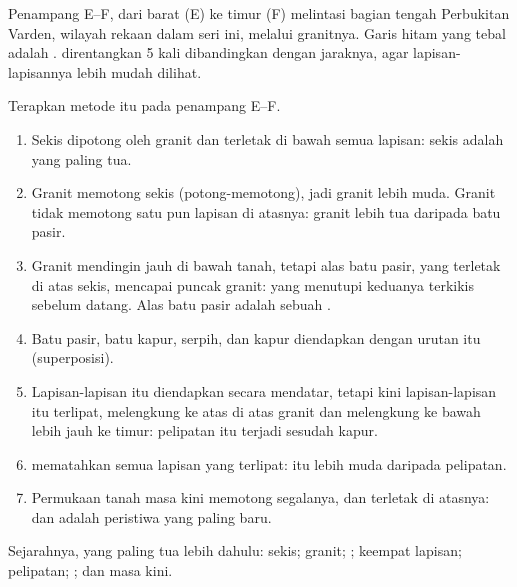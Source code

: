 \begin{omfigure}
\smallskip
{\small Penampang E--F, dari barat (E) ke timur (F) melintasi bagian tengah
Perbukitan Varden, wilayah rekaan dalam seri ini, melalui granitnya. Garis
hitam yang tebal adalah .  direntangkan 5 kali
dibandingkan dengan jaraknya, agar lapisan-lapisannya lebih mudah dilihat.}
\label{fig:g7:geological-time:section}
\end{omfigure}

\begin{example}\label{ex:g7:geological-time:varden}
Terapkan metode itu pada penampang E--F.
\begin{enumerate}
  \item Sekis dipotong oleh granit dan terletak di bawah semua lapisan:
        sekis adalah  yang paling tua.
  \item Granit memotong sekis (potong-memotong), jadi granit lebih muda.
        Granit tidak memotong satu pun lapisan di atasnya: granit lebih tua
        daripada batu pasir.
  \item Granit mendingin jauh di bawah tanah, tetapi alas batu pasir, yang
        terletak di atas sekis, mencapai puncak granit:  yang
        menutupi keduanya terkikis sebelum  datang. Alas batu pasir
        adalah sebuah .
  \item Batu pasir, batu kapur, serpih, dan kapur diendapkan dengan urutan
        itu (superposisi).
  \item Lapisan-lapisan itu diendapkan secara mendatar, tetapi kini
        lapisan-lapisan itu terlipat, melengkung ke atas di atas granit dan
        melengkung ke bawah lebih jauh ke timur: pelipatan itu terjadi
        sesudah kapur.
  \item {} mematahkan semua lapisan yang terlipat:  itu lebih muda
        daripada pelipatan.
  \item Permukaan tanah masa kini memotong segalanya, dan  
        terletak di atasnya:  dan  adalah peristiwa yang
        paling baru.
\end{enumerate}
Sejarahnya, yang paling tua lebih dahulu: sekis; granit; ; keempat
lapisan; pelipatan; ;  dan   masa kini.
\end{example}

